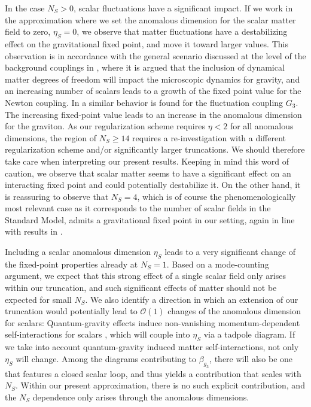 \documentclass[11pt]{book} %
\begin{document}
In the case $N_S>0$, scalar fluctuations have a significant impact. If we work in the approximation where we set the anomalous dimension for the scalar matter field to zero, $\eta_S=0$, we observe that matter fluctuations  have a destabilizing effect on the gravitational fixed point, and move it toward larger values.  This observation is in accordance with the general scenario discussed at the level of the background couplings in \cite{Dona:2013qba, Dona:2014pla}, where it is argued that the inclusion of dynamical matter degrees of freedom will impact the microscopic dynamics for gravity, and an increasing number of scalars leads to a growth of the fixed point value for the Newton coupling. In \cite{Meibohm:2015twa} a similar behavior is found for the fluctuation coupling $G_3$.
The increasing fixed-point value leads to an increase in the anomalous dimension for the graviton.
As our regularization scheme requires $\eta<2$ for all anomalous dimensions, the region of $N_S \geq 14$ requires a re-investigation with a different regularization scheme and/or significantly larger truncations.
We should therefore take care when interpreting our present results. Keeping in mind this word of caution, we observe that scalar matter seems to have a significant effect on an interacting fixed point and could potentially destabilize it.  On the other hand, it is reassuring to observe that $N_S=4$, which is of course the phenomenologically most relevant case as it corresponds to the number of scalar fields in the Standard Model, admits a gravitational fixed point in our setting, again in line with results in \cite{Dona:2013qba, Dona:2014pla, Meibohm:2015twa}.

Including a scalar anomalous dimension $\eta_S$ leads to a very significant change of the fixed-point properties already at $N_S=1$.
Based on a mode-counting argument, we
expect that this strong effect of a single scalar field only arises within our truncation, and such significant effects of matter should not be expected for small $N_S$. We also identify a direction in which an extension of our truncation would potentially lead to $\mathcal{O}(1)$ changes of the anomalous dimension for scalars: Quantum-gravity effects induce non-vanishing momentum-dependent self-interactions for scalars \cite{Eichhorn:2012va}, which will couple into $\eta_S$ via a tadpole diagram.
If we take into account quantum-gravity induced matter self-interactions, not only $\eta_S$ will change. Among the diagrams contributing to $\beta_{g_3}$, there will also be one that features a closed scalar loop, and thus yields a contribution that scales with $N_S$. Within our present approximation, there is no such explicit contribution, and the $N_S$ dependence only arises through the anomalous dimensions.
\end{document}
